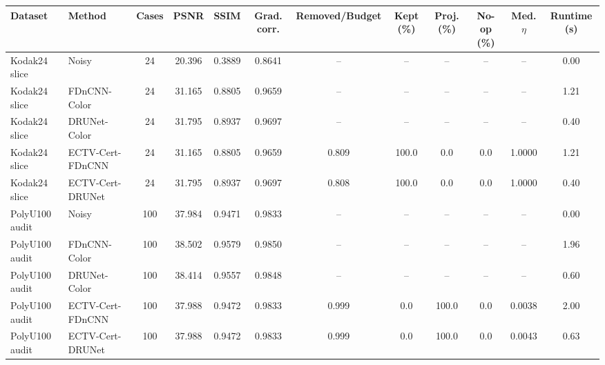 \begin{tabular}{llcccccccccc}
\toprule
Dataset & Method & Cases & PSNR & SSIM & Grad. corr. & Removed/Budget & Kept (\%) & Proj. (\%) & No-op (\%) & Med. $\eta$ & Runtime (s) \\
\midrule
Kodak24 slice & Noisy & 24 & 20.396 & 0.3889 & 0.8641 & -- & -- & -- & -- & -- & 0.00 \\
Kodak24 slice & FDnCNN-Color & 24 & 31.165 & 0.8805 & 0.9659 & -- & -- & -- & -- & -- & 1.21 \\
Kodak24 slice & DRUNet-Color & 24 & 31.795 & 0.8937 & 0.9697 & -- & -- & -- & -- & -- & 0.40 \\
Kodak24 slice & ECTV-Cert-FDnCNN & 24 & 31.165 & 0.8805 & 0.9659 & 0.809 & 100.0 & 0.0 & 0.0 & 1.0000 & 1.21 \\
Kodak24 slice & ECTV-Cert-DRUNet & 24 & 31.795 & 0.8937 & 0.9697 & 0.808 & 100.0 & 0.0 & 0.0 & 1.0000 & 0.40 \\
PolyU100 audit & Noisy & 100 & 37.984 & 0.9471 & 0.9833 & -- & -- & -- & -- & -- & 0.00 \\
PolyU100 audit & FDnCNN-Color & 100 & 38.502 & 0.9579 & 0.9850 & -- & -- & -- & -- & -- & 1.96 \\
PolyU100 audit & DRUNet-Color & 100 & 38.414 & 0.9557 & 0.9848 & -- & -- & -- & -- & -- & 0.60 \\
PolyU100 audit & ECTV-Cert-FDnCNN & 100 & 37.988 & 0.9472 & 0.9833 & 0.999 & 0.0 & 100.0 & 0.0 & 0.0038 & 2.00 \\
PolyU100 audit & ECTV-Cert-DRUNet & 100 & 37.988 & 0.9472 & 0.9833 & 0.999 & 0.0 & 100.0 & 0.0 & 0.0043 & 0.63 \\
\bottomrule
\end{tabular}
